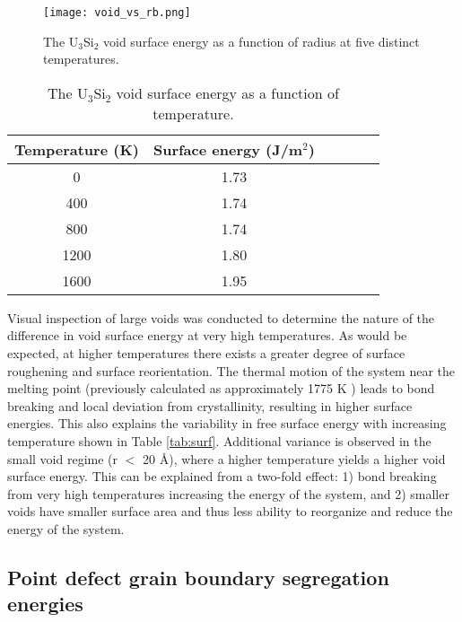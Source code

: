 \documentclass[review]{elsarticle}
\begin{document}
\begin{figure}[h]
 \centering
 \texttt{[image: void\_vs\_rb.png]} 
 \caption{The U$_{3}$Si$_{2}$ void surface energy as a function of radius at five distinct temperatures. }
 \label{fig:void}
\end{figure}

\begin{table}[h]
\caption{The U$_{3}$Si$_{2}$ void surface energy as a function of temperature.} \label{tab:void}
\begin{center}
\begin{tabular}{|c|c|c|c|c|c|}
	\hline
	Temperature (K) & Surface energy (J/m$^{2}$)\\
	 \hline
	 0 & 1.73	  \\
	 400 & 1.74  \\
	 800 & 1.74	  \\
	 1200 & 1.80  \\
	 1600 & 1.95  \\
	 \hline
\end{tabular}
\end{center}
\label{default}
\end{table}

Visual inspection of large voids was conducted to determine the nature of the difference in void surface energy at very high temperatures. As would be expected, at higher temperatures there exists a greater degree of surface roughening and surface reorientation. The thermal motion of the system near the melting point (previously calculated as approximately 1775 K \cite{beelerUSi}) leads to bond breaking and local deviation from crystallinity, resulting in higher surface energies. This also explains the variability in free surface energy with increasing temperature shown in Table \ref{tab:surf}. Additional variance is observed in the small void regime (r $<$ 20 {\AA}), where a higher temperature yields a higher void surface energy. This can be explained from a two-fold effect: 1) bond breaking from very high temperatures increasing the energy of the system, and 2) smaller voids have smaller surface area and thus less ability to reorganize and reduce the energy of the system. 

\FloatBarrier

\subsection{Point defect grain boundary segregation energies}
\end{document}

